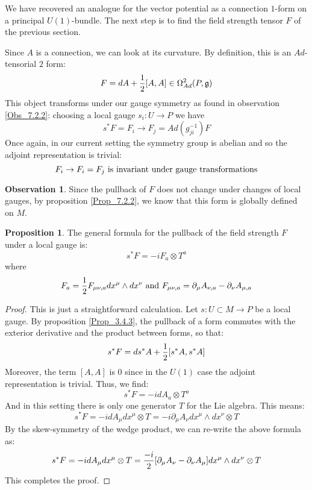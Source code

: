 \documentclass[12pt,a4paper]{report}
\theoremstyle{definition}
\theoremstyle{Theorem}
\newtheorem{Prop}[Def]{Proposition}
\theoremstyle{definition}
\theoremstyle{definition}
\newtheorem{Obs}[Def]{Observation}
\begin{document}
	We have recovered an analogue for the vector potential as a connection $1$-form on a principal $U(1)$-bundle. The next step is to find the field strength tensor $F$ of the previous section.
	\begin{comment}
		\begin{Obs}
			Since the Lie algebra is of dimension 1 there is a clear isomorphism: let $T$ be a generator for $\mathbb{R}$, then
			$$A_1\otimes T\longrightarrow A_1$$
			is a $1$-form on the manifold.
		\end{Obs}
	\end{comment}
	Since $A$ is a connection, we can look at its curvature. By definition, this is an $Ad$-tensorial $2$ form:
	$$F=dA+{1\over 2}[A,A]\in \Omega^2_{Ad}(P,\mathfrak{g})$$
	This object transforms under our gauge symmetry as found in observation \ref{Obs_7.2.2}: choosing a local gauge $s_i:U\rightarrow P$ we have
	$$s^*F=F_i\rightarrow F_j= Ad(g_{ji}^{-1})F$$
	Once again, in our current setting the symmetry group is abelian and so the adjoint representation is trivial:
	$$F_i\rightarrow F_i=F_j\hbox{ is invariant under gauge transformations}$$
	\begin{Obs}
		Since the pullback of $F$ does not change under changes of local gauges, by proposition \ref{Prop_7.2.2}, we know that this form is globally defined on $M$.
	\end{Obs}
	\begin{Prop}
		The general formula for the pullback of the field strength $F$ under a local gauge is:
		$$s^*F=-iF_a\otimes T^a$$
		where
		$$F_a={1\over 2}F_{\mu\nu,a}dx^\mu\wedge dx^\nu\hbox{ and } F_{\mu\nu,a}=\partial_\mu A_{\nu,a}-\partial_\nu A_{\mu,a}$$
	\end{Prop}
	\begin{proof}
		This is just a straightforward calculation. Let $s:U\subset M\rightarrow P$ be a local gauge. By proposition \ref{Prop_3.4.3}, the pullback of a form commutes with the exterior derivative and the product between forms, so that:
		$$s^*F=ds^*A+{1\over 2}[s^*A,s^*A]$$
		Moreover, the term $[A,A]$ is 0 since in the $U(1)$ case the adjoint representation is trivial. Thus, we find:
		$$s^*F=-idA_a\otimes T^a$$
		And in this setting there is only one generator $T$ for the Lie algebra. This means:
		$$s^*F=-idA_\mu dx^\mu\otimes T=-i\partial_\mu A_\nu dx^\mu\wedge dx^\nu \otimes T$$
		By the skew-symmetry of the wedge product, we can re-write the above formula as:
		$$s^*F=-idA_\mu dx^\mu\otimes T={-i\over 2}[\partial_\mu A_\nu-\partial_\nu A_\mu] dx^\mu\wedge dx^\nu \otimes T$$
		This completes the proof.
	\end{proof}
\end{document}
